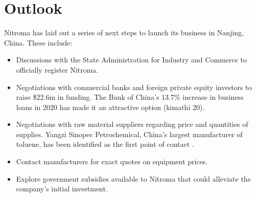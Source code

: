 \section{Outlook}
Nitroma has laid out a series of next steps to launch its business in Nanjing, China. These include:
\begin{itemize}
    \item Discussions with the State Administration for Industry and Commerce to officially register Nitroma.
    \item Negotiations with commercial banks and foreign private equity investors to raise \$22.6m in funding. The Bank of China’s 13.7\% increase in business loans in 2020 has made it an attractive option (kimathi 20).
    \item Negotiations with raw material suppliers regarding price and quantities of supplies. Yangzi Sinopec Petrochemical, China’s largest manufacturer of toluene, has been identified as the first point of contact \cite{sinopec_group_sinopec_2014}.
    \item Contact manufacturers for exact quotes on equipment prices.
    \item Explore government subsidies available to Nitroma that could alleviate the company’s initial investment. 
\end{itemize}




